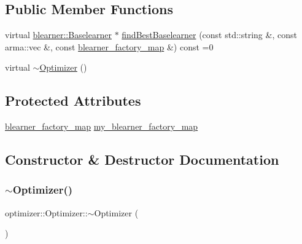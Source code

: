 \subsection*{Public Member Functions}
\begin{DoxyCompactItemize}
\item 
virtual \hyperlink{classblearner_1_1_baselearner}{blearner\+::\+Baselearner} $\ast$ \hyperlink{classoptimizer_1_1_optimizer_a134c7b34ed868231fbab53e9ebfa8fd8}{find\+Best\+Baselearner} (const std\+::string \&, const arma\+::vec \&, const \hyperlink{baselearner__factory__list_8h_a058570e00ae11b882cfed36eb40be025}{blearner\+\_\+factory\+\_\+map} \&) const =0
\item 
virtual \hyperlink{classoptimizer_1_1_optimizer_a7618771af9e91ff8367a02c5ff49a376}{$\sim$\+Optimizer} ()
\end{DoxyCompactItemize}
\subsection*{Protected Attributes}
\begin{DoxyCompactItemize}
\item 
\hyperlink{baselearner__factory__list_8h_a058570e00ae11b882cfed36eb40be025}{blearner\+\_\+factory\+\_\+map} \hyperlink{classoptimizer_1_1_optimizer_a93f8af0ef81986bc208cab5e3cc2ba31}{my\+\_\+blearner\+\_\+factory\+\_\+map}
\end{DoxyCompactItemize}


\subsection{Constructor \& Destructor Documentation}
\mbox{\label{classoptimizer_1_1_optimizer_a7618771af9e91ff8367a02c5ff49a376}} 
\subsubsection{\texorpdfstring{$\sim$\+Optimizer()}{~Optimizer()}}
{\footnotesize\ttfamily optimizer\+::\+Optimizer\+::$\sim$\+Optimizer (\begin{DoxyParamCaption}{ }\end{DoxyParamCaption})\hspace{0.3cm}{\ttfamily [virtual]}}



